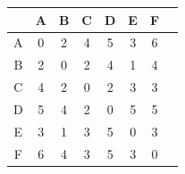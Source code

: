 \documentclass[12pt]{article}
\begin{document}
\begin{center}
	\begin{tabular}{|c||c|c|c|c|c|c|c|}
		\hline
		  & A & B & C & D & E & F \\\hline
		\hline
		A & 0 & 2 & 4 & 5 & 3 & 6 \\\hline
		B & 2 & 0 & 2 & 4 & 1 & 4 \\\hline
		C & 4 & 2 & 0 & 2 & 3 & 3 \\\hline
		D & 5 & 4 & 2 & 0 & 5 & 5 \\\hline
		E & 3 & 1 & 3 & 5 & 0 & 3 \\\hline
		F & 6 & 4 & 3 & 5 & 3 & 0 \\\hline
	\end{tabular}
\end{center}
%
%
\end{document}
